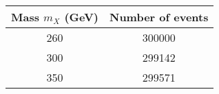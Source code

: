 \begin{tabular}{c | c}
Mass $m_X$ (GeV) & Number of events \\ \hline
260 & 300000\\
300 & 299142\\
350 & 299571\\
\end{tabular}
